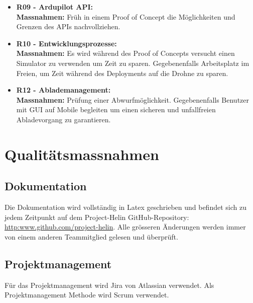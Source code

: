 \begin{itemize}
	\item{\textbf{R09 - Ardupilot API:} \\
	\textbf{Massnahmen:} Früh in einem Proof of Concept die Möglichkeiten und Grenzen des APIs nachvollziehen.}
	
	\item{\textbf{R10 - Entwicklungsprozesse:} \\
	\textbf{Massnahmen:} Es wird während des Proof of Concepts versucht einen Simulator zu verwenden um Zeit zu sparen. Gegebenenfalls Arbeitsplatz im Freien, um Zeit während des Deployments auf die Drohne zu sparen.}
	
	\item{\textbf{R12 - Ablademanagement:} \\
	\textbf{Massnahmen:} Prüfung einer Abwurfmöglichkeit. Gegebenenfalls Benutzer mit GUI auf Mobile begleiten um einen sicheren und unfallfreien Abladevorgang zu garantieren.}
\end{itemize}

\section{Qualitätsmassnahmen}	
\subsection{Dokumentation}
Die Dokumentation wird vollständig in Latex geschrieben und befindet sich zu jedem Zeitpunkt auf dem Project-Helin GitHub-Repository: \url{http:www.github.com/project-helin}. Alle grösseren Änderungen werden immer von einem anderen Teammitglied gelesen und überprüft.

\subsection{Projektmanagement}
Für das Projektmanagement wird Jira von Atlassian verwendet. Als Projektmanagement Methode wird Scrum verwendet.

